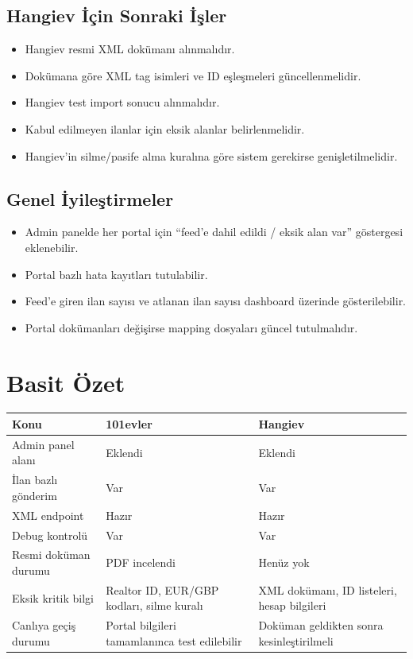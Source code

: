 \documentclass[11pt,a4paper]{article}
\begin{document}
\subsection{Hangiev İçin Sonraki İşler}

\begin{itemize}
  \item Hangiev resmi XML dokümanı alınmalıdır.
  \item Dokümana göre XML tag isimleri ve ID eşleşmeleri güncellenmelidir.
  \item Hangiev test import sonucu alınmalıdır.
  \item Kabul edilmeyen ilanlar için eksik alanlar belirlenmelidir.
  \item Hangiev'in silme/pasife alma kuralına göre sistem gerekirse genişletilmelidir.
\end{itemize}

\subsection{Genel İyileştirmeler}

\begin{itemize}
  \item Admin panelde her portal için ``feed'e dahil edildi / eksik alan var'' göstergesi eklenebilir.
  \item Portal bazlı hata kayıtları tutulabilir.
  \item Feed'e giren ilan sayısı ve atlanan ilan sayısı dashboard üzerinde gösterilebilir.
  \item Portal dokümanları değişirse mapping dosyaları güncel tutulmalıdır.
\end{itemize}

\section{Basit Özet}

\begin{longtable}{|p{3.5cm}|p{5.5cm}|p{5.5cm}|}
\hline
\textbf{Konu} & \textbf{101evler} & \textbf{Hangiev} \\
\hline
Admin panel alanı & Eklendi & Eklendi \\
\hline
İlan bazlı gönderim & Var & Var \\
\hline
XML endpoint & Hazır & Hazır \\
\hline
Debug kontrolü & Var & Var \\
\hline
Resmi doküman durumu & PDF incelendi & Henüz yok \\
\hline
Eksik kritik bilgi & Realtor ID, EUR/GBP kodları, silme kuralı & XML dokümanı, ID listeleri, hesap bilgileri \\
\hline
Canlıya geçiş durumu & Portal bilgileri tamamlanınca test edilebilir & Doküman geldikten sonra kesinleştirilmeli \\
\hline
\end{longtable}
\end{document}
